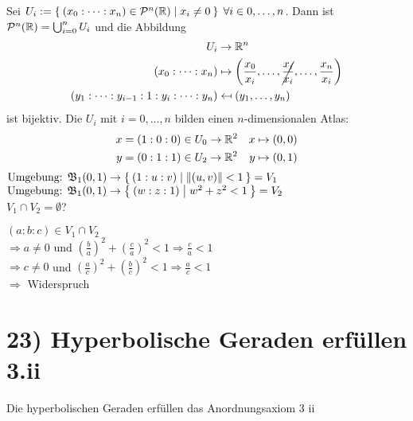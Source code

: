 \documentclass[a5paper,oneside]{scrbook}
\begin{document}
Sei $U_i := \Set{(x_0: \dots : x_n) \in \ensuremath{\mathcal{P}}^n(\ensuremath{\mathbb{R}}) | x_i \neq 0}\;\forall i \in 0, \dots, n$.
Dann ist $\mathcal{P}^n(\mathbb{R}) = \bigcup_{i=0}^n U_i$ und die Abbildung
\begin{align*}
  U_i &\rightarrow \mdr^n\\
  (x_0 : \dots : x_n) &\mapsto \left (\frac{x_0}{x_i}, \dots, \cancel{\frac{x_i}{x_i}}, \dots, \frac{x_n}{x_i} \right )\\
  (y_1 : \dots : y_{i-1} : 1 : y_i : \dots : y_n) &\mapsfrom (y_1, \dots, y_n)
\end{align*}
ist bijektiv.
Die $U_i$ mit $i = 0, \dots, n$ bilden einen $n$-dimensionalen Atlas:
\begin{align*}
        x &= (1:0:0) \in U_0 \rightarrow \mathbb{R}^2 & x &\mapsto (0,0)\\
        y &= (0:1:1) \in U_2 \rightarrow \mathbb{R}^2 & y &\mapsto (0,1)
\end{align*}
$\text{Umgebung: } \mathfrak{B}_1 (0,1) \rightarrow \Set{(1:u:v) | \|(u,v)\| < 1} = V_1$\\
$\text{Umgebung: } \mathfrak{B}_1 (0,1) \rightarrow \Set{(w:z:1) | w^2 + z^2 < 1} = V_2$\\

$V_1 \cap V_2 = \emptyset$?

$(a:b:c) \in V_1 \cap V_2$\\
$\Rightarrow a \neq 0$ und $(\frac{b}{a})^2 + (\frac{c}{a})^2 < 1 \Rightarrow \frac{c}{a} < 1$\\
$\Rightarrow c \neq 0$ und $(\frac{a}{c})^2 + (\frac{b}{c})^2 < 1 \Rightarrow \frac{a}{c} < 1$\\
$\Rightarrow$ Widerspruch


\section*{23) Hyperbolische Geraden erfüllen 3.ii}
\begin{bemerkung}
    Die hyperbolischen Geraden erfüllen das Anordnungsaxiom 3 ii
\end{bemerkung}
\end{document}
